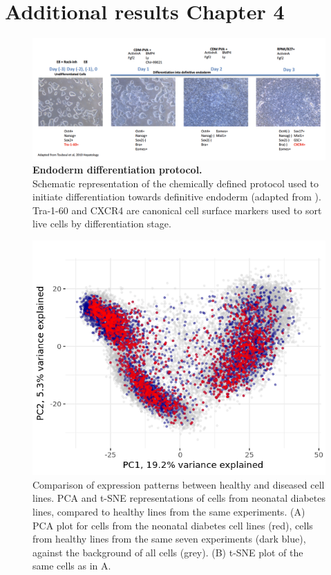 \clearpage

\section{Additional results Chapter 4}

\begin{figure}[h]
    \centering
    \includegraphics[width=16cm]{Appendix2/Fig/suppl_protocol.png}
    \caption[Endoderm differentiation protocol]{\textbf{Endoderm differentiation protocol.}\\
    Schematic representation of the chemically defined protocol used to initiate differentiation towards  definitive endoderm (adapted from \cite{touboul2010generation}). 
    Tra-1-60 and CXCR4 are canonical cell surface markers used to sort live cells by differentiation stage. }
    \label{suppl_fig:endodiff_exp_protocol}
\end{figure}

\begin{figure}[h]
    \centering
    \includegraphics[width=15cm]{Appendix2/Fig/suppl_diabetes_lines.png}
    \caption[PCA of healthy and diseased cell lines]{Comparison of expression patterns between healthy and diseased cell lines.
    PCA and t-SNE representations of cells from neonatal diabetes lines, compared to healthy lines from the same experiments. 
    (A) PCA plot for cells from the neonatal diabetes cell lines (red), cells from healthy lines from the same seven experiments (dark blue), against the background of all cells (grey). 
    (B) t-SNE plot of the same cells as in A.}
    \label{suppl_fig:pca_diabetes_lines}
\end{figure}

